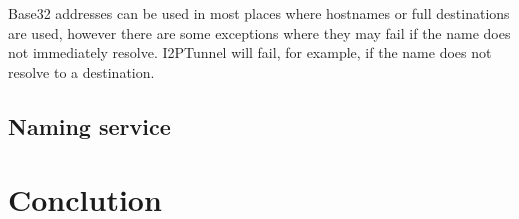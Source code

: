 \documentclass[a4paper,twocolumn,12pt]{article}
\begin{document}
Base32 addresses can be used in most places where hostnames or full
destinations are used, however there are some exceptions where they may fail if
the name does not immediately resolve. I2PTunnel will fail, for example, if the
name does not resolve to a destination.

\subsection{Naming service}


\section{Conclution}




\end{document}

